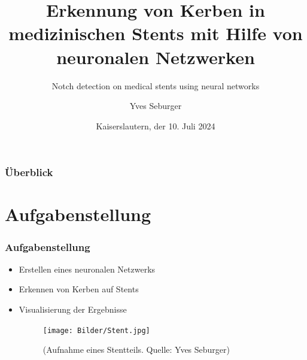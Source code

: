 \documentclass{beamer}
\title{Erkennung von Kerben in medizinischen Stents mit Hilfe von neuronalen Netzwerken}
\subtitle{\small Notch detection on medical stents using neural networks}
\author{Yves Seburger}
\date{Kaiserslautern, der 10. Juli 2024}
\institute{Hochschule Kaiserslautern\newline
Schoenstr. 11\newline
67659 Kaiserslautern}
\begin{document}
\frame{\titlepage}

\begin{frame}
\frametitle{Überblick}
\tableofcontents
\end{frame}

\section{Aufgabenstellung}
\begin{frame}[allowframebreaks]
\frametitle{Aufgabenstellung}
\begin{itemize}
    \item Erstellen eines neuronalen Netzwerks
    \item Erkennen von Kerben auf Stents
    \item Visualisierung der Ergebnisse
    \begin{figure}
        \texttt{[image: Bilder/Stent.jpg]}
        \caption{(Aufnahme eines Stentteils. Quelle: Yves Seburger)}
    \end{figure}  
\end{itemize}
\end{frame}
\end{document}
